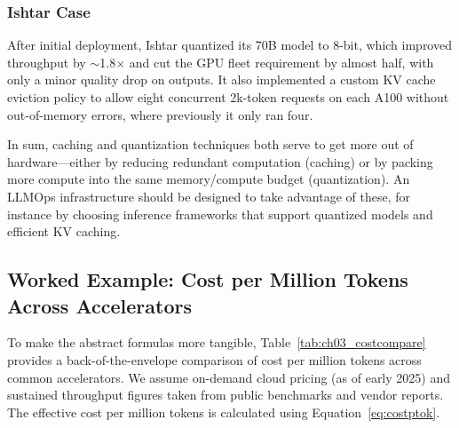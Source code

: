 \subsubsection{Ishtar Case} 
After initial deployment, Ishtar quantized its 70B model to 8-bit, which improved throughput by $\sim$1.8$\times$ and cut the GPU fleet requirement by almost half, with only a minor quality drop on outputs. It also implemented a custom KV cache eviction policy to allow eight concurrent 2k-token requests on each A100 without out-of-memory errors, where previously it only ran four.

In sum, caching and quantization techniques both serve to get more out of hardware---either by reducing redundant computation (caching) or by packing more compute into the same memory/compute budget (quantization). An LLMOps infrastructure should be designed to take advantage of these, for instance by choosing inference frameworks that support quantized models and efficient KV caching.

\subsection{Worked Example: Cost per Million Tokens Across Accelerators}

To make the abstract formulas more tangible, Table~\ref{tab:ch03_costcompare} provides a back-of-the-envelope comparison of cost per million tokens across common accelerators. 
We assume on-demand cloud pricing (as of early 2025) and sustained throughput figures taken from public benchmarks and vendor reports. 
The effective cost per million tokens is calculated using Equation~\ref{eq:costptok}. 

